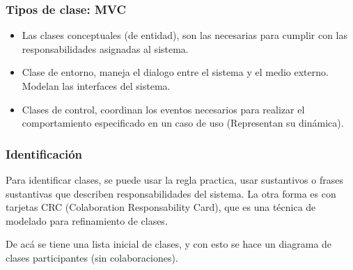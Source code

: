 \documentclass[titlepage,a4paper]{article}
\begin{document}
\subsubsection*{Tipos de clase: MVC}
\begin{itemize}
    \item Las clases conceptuales (de entidad), son las necesarias para cumplir con las responsabilidades asignadas al sistema.
    \item Clase de entorno, maneja el dialogo entre el sistema y el medio externo. Modelan las interfaces del sistema.
    \item Clases de control, coordinan los eventos necesarios para realizar el comportamiento especificado en un caso de uso (Representan su dinámica).
\end{itemize}


\subsubsection*{Identificación}

Para identificar clases, se puede usar la regla practica, usar sustantivos o frases sustantivas que describen responsabilidades del sistema. La otra forma es con tarjetas CRC (Colaboration Responsability Card), que es una técnica de modelado para refinamiento de clases.

De acá se tiene una lista inicial de clases, y con esto se hace un diagrama de clases participantes (sin colaboraciones).
\end{document}
